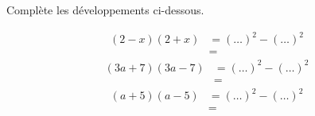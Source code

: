 %
%
Complète les développements ci-dessous.
  \begin{tasks}
    \task
    \begin{align*}
      \left(2-x\right)\left(2+x\right)
      &= \left( \dots \right)^2 - \left( \dots \right)^2 \\
      &=
    \end{align*}
    \task
    \begin{align*}
      \left(3a+7\right)\left(3a-7\right)
      &= \left( \dots \right)^2 - \left( \dots \right)^2 \\
      &=
    \end{align*}
    \task
    \begin{align*}
      \left(a+5\right)\left(a-5\right)
      &= \left( \dots \right)^2 - \left( \dots \right)^2 \\
      &=
    \end{align*}
  \end{tasks}
